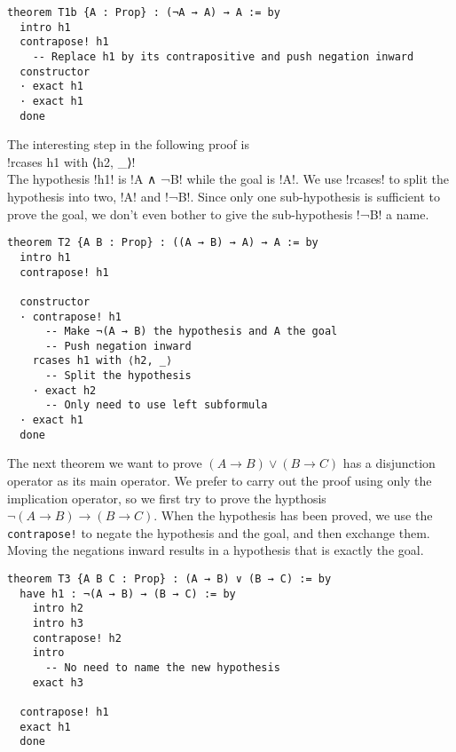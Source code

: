\begin{Verbatim}[firstnumber=last]
theorem T1b {A : Prop} : (¬A → A) → A := by
  intro h1
  contrapose! h1
    -- Replace h1 by its contrapositive and push negation inward
  constructor
  · exact h1
  · exact h1
  done
\end{Verbatim}


The interesting step in the following proof is \\
\indnt{}!rcases h1 with ⟨h2, _⟩!\\
The hypothesis !h1! is !A ∧ ¬B! while the goal is !A!. We use !rcases! to split the hypothesis into two, !A! and !¬B!. Since only one sub-hypothesis is sufficient to prove the goal, we don't even bother to give the sub-hypothesis !¬B! a name.
\begin{Verbatim}[firstnumber=last]
theorem T2 {A B : Prop} : ((A → B) → A) → A := by
  intro h1
  contrapose! h1

  constructor
  · contrapose! h1
      -- Make ¬(A → B) the hypothesis and A the goal
      -- Push negation inward
    rcases h1 with ⟨h2, _⟩
      -- Split the hypothesis
    · exact h2
      -- Only need to use left subformula
  · exact h1
  done
\end{Verbatim}


The next theorem we want to prove $(A\rightarrow B) \vee (B \rightarrow C)$ has a disjunction operator as its main operator. We prefer to carry out the proof using only the implication operator, so we first try to prove the hypthosis $\neg(A\rightarrow B) \rightarrow (B \rightarrow C)$. When the hypothesis has been proved, we use the \Verb+contrapose!+ to negate the hypothesis and the goal, and then exchange them. Moving the negations inward results in a hypothesis that is exactly the goal.
\begin{Verbatim}[firstnumber=last]
theorem T3 {A B C : Prop} : (A → B) ∨ (B → C) := by
  have h1 : ¬(A → B) → (B → C) := by
    intro h2
    intro h3
    contrapose! h2
    intro
      -- No need to name the new hypothesis
    exact h3

  contrapose! h1
  exact h1
  done
\end{Verbatim}

